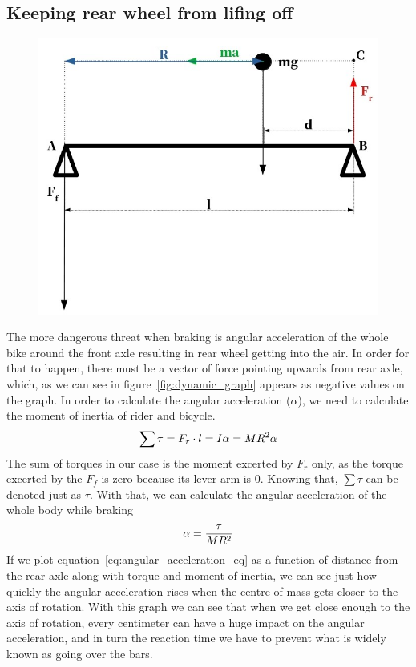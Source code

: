 \documentclass[12pt, a4]{article}
\begin{document}
\subsection{Keeping rear wheel from lifing off}
\begin{figure}[H]
\caption{}
\centering%
\label{fig:angular_acceleration_figure}
\includegraphics[width=0.5\linewidth]{angular_acceleration_diagram}%
\end{figure}
The more dangerous threat when braking is angular acceleration of the whole bike around the front axle resulting
in rear wheel getting into the air. In order for that to happen, there must be a vector of force pointing upwards
from rear axle, which, as we can see in figure~\ref{fig:dynamic_graph} appears as negative values on the graph.
In order to calculate the angular acceleration ($\alpha$), we need to calculate the moment of inertia of rider 
and bicycle.
\begin{equation}
\centering%
\label{eq:moment_of_inertia}
\sum \tau = F_r \cdot l =  I\alpha = MR^2\alpha
\end{equation}
The sum of torques in our case is the moment excerted by $F_r$ only, as the torque excerted by the $F_f$ is 
zero because its lever arm is 0. Knowing that, $\sum \tau$ can be denoted just as $\tau$. With that, we can
calculate the angular acceleration of the whole body while braking
\begin{equation}
\centering%
\label{eq:angular_acceleration_eq}
\alpha = \frac{\tau}{MR^2}
\end{equation}
If we plot equation~\ref{eq:angular_acceleration_eq} as a function of distance from the rear axle along with 
torque and moment of inertia, we can see just how quickly the angular acceleration rises when the centre of mass
gets closer to the axis of rotation. With this graph we can see that when we get close enough to the axis of 
rotation, every centimeter can have a huge impact on the angular acceleration, and in turn the reaction time 
we have to prevent what is widely known as going over the bars.
\end{document}
